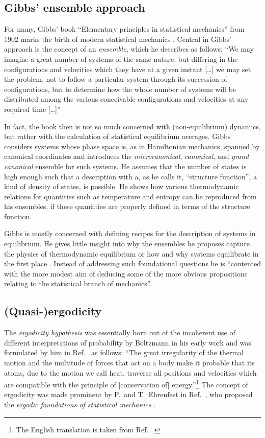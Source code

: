 \documentclass[a4paper,12pt,listof=totoc,index=totoc,bibliography=totoc,headsepline=false,headings=normal,BCOR16.153846mm,DIV12,headinclude,twoside,cleardoublepage=empty,numbers=noenddot,final]{scrreprt}
\theoremstyle{mystyle}
\numberwithin{equation}{section}
\numberwithin{figure}{section}
\numberwithin{lemma}{section}
\numberwithin{theorem}{section}
\numberwithin{corollary}{section}
\numberwithin{definition}{section}
\numberwithin{conjecture}{section}
\numberwithin{observation}{section}
\newcommand{\+}{\mkern2mu}
\DeclareMathOperator{\1}{\mathds{1}}
\begin{document}
\subsection{Gibbs'  ensemble approach}
\label{sec:gibbsensembleapproach}
%
For many, Gibbs' book ``Elementary principles in statistical mechanics'' \cite{Gibbs1902} from 1902 marks the birth of modern statistical mechanics \cite{UffinkFinal}.
Central in Gibbs' approach is the concept of an \emph{ensemble}, which he describes as follows:
``We may imagine a great number of systems of the same nature, but differing in the configurations and velocities which they have at a given instant [\dots] we may set the problem, not to follow a particular system through its succession of configurations, but to determine how the whole number of systems will be distributed among the various conceivable configurations and velocities at any required time [\dots]''

In fact, the book then is not so much concerned with (non-equilibrium) dynamics, but rather with the calculation of statistical equilibrium averages.
Gibbs considers systems whose phase space is, as in Hamiltonian mechanics, spanned by canonical coordinates and introduces the \emph{microcanonical}, \emph{canonical}, and \emph{grand canonical} ensemble for such systems.
He assumes that the number of states is high enough such that a description with a, as he calls it, ``structure function'', a kind of density of states, is possible. 
He shows how various thermodynamic relations for quantities such as temperature and entropy can be reproduced from his ensembles, if these quantities are properly defined in terms of the structure function. 

Gibbs is mostly concerned with defining recipes for the description of systems in equilibrium.
He gives little insight into why the ensembles he proposes capture the physics of thermodynamic equilibrium or how and why systems equilibrate in the first place \cite{UffinkFinal}.
Instead of addressing such foundational questions he is ``contented with the more modest aim of deducing some of the more obvious propositions relating to the statistical branch of mechanics''\cite{Gibbs1902}.


\subsection{(Quasi-)ergodicity}
\label{sec:ergodicity}
%
The \emph{ergodicity hypothesis} was essentially born out of the incoherent use of different interpretations of probability by Boltzmann in his early work \cite{Boltzmann1868} and was formulated by him in Ref.~\cite{Boltzmann1871} as follows:
``The great irregularity of the thermal motion and the multitude of forces that act on a body make it probable that its atoms, due to the motion we call heat, traverse all positions and velocities which are compatible with the principle of [conservation of] energy.''\footnote{The English translation is taken from Ref.~\cite{UffinkFinal}.}
The concept of ergodicity was made prominent by P.\ and T.\ Ehrenfest in Ref.~\cite{Ehrenfest2002}, who proposed the \emph{ergodic foundations of statistical mechanics} \cite{UffinkFinal}.
\end{document}
